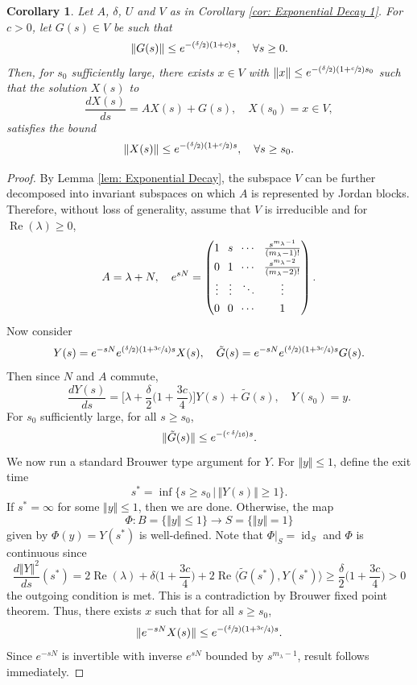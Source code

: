 \documentclass[JEP,XML,SOM,Unicode]{cedram}
\newcommand{\Psfrac}[2]{(\sfrac{#1}{#2})}
\theoremstyle{plain}
\newtheorem{corollary}[proposition]{Corollary}
\theoremstyle{definition}
\DeclareMathOperator{\id}{id}
\def\Re{\operatorname{Re}}
\begin{document}
\begin{corollary}
\label{cor: Exponential Decay 2}
Let $A$, $\delta$, $U$ and $V$ as in \emph{Corollary \ref{cor: Exponential Decay 1}}. For $c>0$, let $G(s)\in V$ be such that
\[
\Vert G(s)\Vert\le e^{-\Psfrac{\delta}{2}(1+c)s},\quad \forall s\ge 0.
\]
Then, for $s_0$ sufficiently large, there exists $x\in V$ with $\Vert x\Vert\le e^{-\Psfrac{\delta}{2}(1+\sfrac{c}{2})s_0}$ such that the solution $X(s)$ to
\[
\frac{dX(s)}{ds}=AX(s)+G(s),\quad X(s_0)=x\in V,
\]
satisfies the bound
\[
\Vert X(s)\Vert \le e^{-\Psfrac{\delta}{2}(1+\sfrac{c}{2})s},\quad \forall s\ge s_0.
\]
\end{corollary}
\begin{proof}
By Lemma \ref{lem: Exponential Decay}, the subspace $V$ can be further decomposed into invariant subspaces on which $A$ is represented by Jordan blocks. Therefore, without loss of generality, assume that $V$ is irreducible and for $\Re(\lambda)\ge0$,
\begin{equation}
\label{eq: Jordan Block}
\arraycolsep3.5pt
A=\lambda+N,\quad e^{sN}=
\begin{pmatrix}
1 & s& \cdots & \tfrac{s^{m_\lambda-1}}{(m_\lambda -1)!}\\[3pt]
0 & 1 & \cdots & \tfrac{s^{m_\lambda-2}}{(m_\lambda -2)!}\\[3pt]
\vdots & \vdots &\ddots& \vdots\\[3pt]
0 & 0 & \cdots & 1
\end{pmatrix}.
\end{equation}
Now consider
\[
Y(s)= e^{-sN}e^{\Psfrac{\delta}{2}(1+\sfrac{3c}{4})s}X(s),\quad \tilde G(s)=e^{-sN}e^{\Psfrac{\delta}{2}(1+\sfrac{3c}{4})s}G(s).
\]
Then since $N$ and $A$ commute,
\[
\frac{dY(s)}{ds}=\Big[\lambda+\frac{\delta}{2}\Big(1+\frac{3c}{4}\Big)\Big]Y(s)+\tilde G(s),\quad Y(s_0)=y.
\]
For $s_0$ sufficiently large, for all $s\ge s_0$,
\[
\Vert\tilde G(s)\Vert \le e^{-\Psfrac{c\,\delta}{16}s}.
\]
We now run a standard Brouwer type argument for $Y$. For $\Vert y \Vert \le 1$, define the exit time
\[
s^*=\inf\{s\ge s_0\,|\, \Vert Y(s)\Vert\ge1\}.
\]
If $s^*=\infty$ for some $\Vert y\Vert \le 1$, then we are done. Otherwise, the map
\[
\Phi:B=\{\Vert y\Vert \le1\}\to S=\{\Vert y\Vert =1\}
\]
given by $\Phi(y)=Y(s^*)$ is well-defined. Note that $\Phi|_{S}=\id_S$ and $\Phi$ is continuous since
\[
\frac{d\Vert Y\Vert^2}{ds}(s^*)=2\Re(\lambda)+\delta\Big(1+\frac{3c}{4}\Big)+2\Re\langle \tilde G(s^*),Y(s^*)\rangle\ge \frac{\delta}{2}\Big(1+\frac{3c}{4}\Big)>0
\]
\ie the outgoing condition is met. This is a contradiction by Brouwer fixed point theorem. Thus, there exists $x$ such that for all $s\ge s_0$,
\[
\Vert e^{-sN}X(s)\Vert \le e^{-\Psfrac{\delta}{2}(1+\sfrac{3c}{4})s}.
\]
Since $e^{-sN}$ is invertible with inverse $e^{sN}$ bounded by $s^{m_\lambda-1}$, result follows immediately.
\end{proof}
\end{document}

